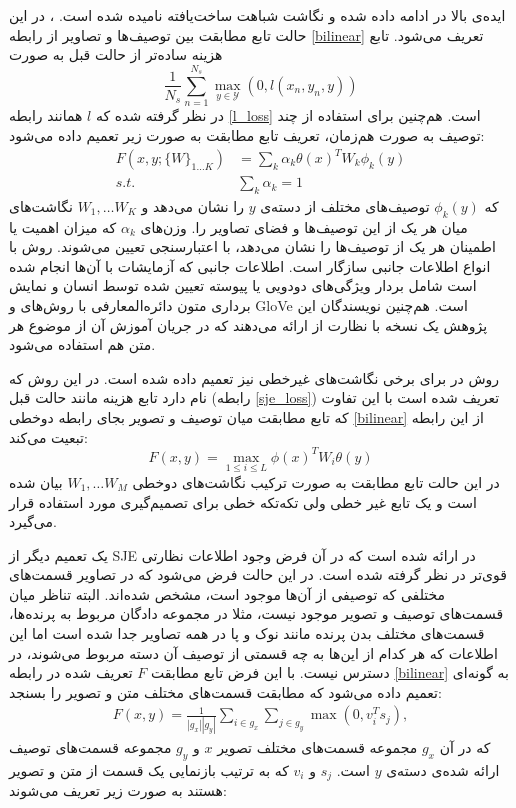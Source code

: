 ایده‌ی بالا در \cite{Akata2015} ادامه داده شده و نگاشت شباهت ساخت‌یافته
نامیده شده است.
، در این حالت تابع مطابقت بین توصیف‌ها و تصاویر از رابطه  \eqref{bilinear} تعریف می‌شود. تابع هزینه ساده‌تر از حالت قبل به صورت
\begin{equation} \label{sje_loss}
\frac{1}{N_s} \sum_{n=1}^{N_s} \max_{y \in \mathcal{Y}}(0, l(x_n, y_n, y))
\end{equation}
در نظر گرفته شده که $l$ همانند رابطه \eqref{l_loss} است. هم‌چنین برای استفاده از چند توصیف به صورت هم‌زمان، تعریف تابع مطابقت به صورت زیر تعمیم داده می‌شود:
\begin{align}
F(x,y;\{W\}_{1\ldots K}) &= \sum_k \alpha_k \theta(x)^T W_k \phi_k(y)  \\
s.t. & \sum_k \alpha_k = 1 \nonumber
\end{align}
که $\phi_k(y)$ توصیف‌های مختلف از دسته‌ی $y$ را نشان می‌دهد و $W_1, \ldots W_K$ نگاشت‌های میان هر یک از این توصیف‌ها و فضای تصاویر را. وزن‌های $\alpha_k$ که میزان اهمیت یا اطمینان  هر یک از توصیف‌ها را نشان می‌دهد، با اعتبارسنجی تعیین می‌شوند. روش  با انواع اطلاعات جانبی سازگار است. اطلاعات جانبی که آزمایشات با آن‌ها انجام شده است شامل بردار ویژگی‌های دودویی یا پیوسته تعیین شده توسط انسان و نمایش برداری متون دائره‌المعارفی با روش‌های  \cite{word2vec} و GloVe
\cite{pennington2014glove}
است. هم‌چنین نویسندگان این پژوهش یک نسخه با نظارت از  ارائه می‌دهند که در جریان آموزش آن از موضوع هر متن هم استفاده می‌شود.

 روش  در \cite{Xian2016} برای برخی نگاشت‌های غیرخطی نیز تعمیم داده شده است. در این روش  که
 نام دارد تابع هزینه مانند حالت قبل (رابطه \eqref{sje_loss}) تعریف شده است با این تفاوت که تابع مطابقت میان توصیف و تصویر بجای رابطه دوخطی \eqref{bilinear} از این رابطه تبعیت می‌کند:
 \begin{equation} \label{latem}
 F(x,y) = \max_{1\leq i \leq L} \phi(x)^TW_i \theta(y)
 \end{equation}
در این حالت تابع مطابقت به صورت ترکیب نگاشت‌های دوخطی $W_1, \ldots W_M$ بیان شده است و یک تابع غیر خطی ولی تکه‌تکه خطی  برای تصمیم‌گیری مورد استفاده قرار می‌گیرد.

یک تعمیم دیگر از SJE در \cite{multicue} ارائه شده است که در آن فرض وجود اطلاعات نظارتی قوی‌تر در نظر گرفته شده است.  در این حالت فرض می‌شود که در تصاویر قسمت‌های مختلفی که توصیفی از آن‌ها موجود است، مشخص شده‌اند. البته تناظر میان قسمت‌های توصیف و تصویر موجود نیست، مثلا در مجموعه دادگان مربوط به پرنده‌ها، قسمت‌های مختلف بدن پرنده مانند نوک و پا در همه تصاویر جدا شده است اما این اطلاعات که هر کدام از این‌ها به چه قسمتی از توصیف آن دسته مربوط می‌شوند، در دسترس نیست. با این فرض تابع مطابقت $F$ تعریف شده در رابطه \eqref{bilinear} به گونه‌ای تعمیم داده می‌شود که مطابقت قسمت‌های مختلف متن و تصویر را بسنجد:
\begin{align}
F(x,y) = \frac{1}{|g_x||g_y|} \sum_{i\in g_x}\sum_{j\in g_y} \max(0,v_i^Ts_j),
\end{align}
که در آن 
 $g_x$ 
 مجموعه قسمت‌های مختلف تصویر $x$ و  $g_y$ مجموعه قسمت‌های توصیف ارائه شده‌ی دسته‌ی $y$ است. $s_j$ و $v_i$ که به ترتیب بازنمایی یک قسمت از متن و تصویر هستند به صورت زیر تعریف می‌شوند:
 

